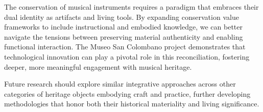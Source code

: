 The conservation of musical instruments requires a paradigm that embraces their dual identity as artifacts and living tools. By expanding conservation value frameworks to include instructional and embodied knowledge, we can better navigate the tensions between preserving material authenticity and enabling functional interaction. The Museo San Colombano project demonstrates that technological innovation can play a pivotal role in this reconciliation, fostering deeper, more meaningful engagement with musical heritage.

Future research should explore similar integrative approaches across other categories of heritage objects embodying craft and practice, further developing methodologies that honor both their historical materiality and living significance.

